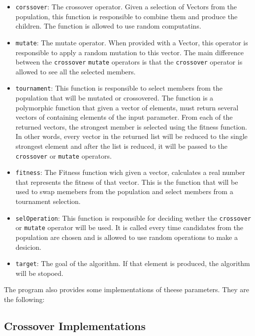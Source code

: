 \documentclass[10pt]{article}
\begin{document}
\begin{itemize}
\item \verb+corssover+: The crossover operator. Given a selection of Vectors from the population, this function is responsible to combine them and produce the children. The function is allowed to use random computatins.
\item \verb+mutate+: The mutate operator. When provided with a Vector, this operator is responsible to apply a random mutation to this vector. The main difference between the \verb+crossover+ \verb+mutate+ operators is that the \verb+crossover+ operator is allowed to see all the selected members.
\item \verb+tournament+: This function is responsible to select members from the population that will be mutated or crossovered. The function is a polymorphic function that given a vector of elements, must return several vectors of containing elements of the input parameter. From each of the returned vectors, the strongest member is selected using the fitness function. In other words, every vector in the returned list will be reduced to the single strongest element and after the list is reduced, it will be passed to the \verb+crossover+ or \verb+mutate+ operators.
\item \verb+fitness+: The Fitness function wich given a vector, calculates a real number that represents the fitness of that vector. This is the function that will be used to swap memebers from the population and select members from a tournament selection.
\item \verb+selOperation+: This function is responsible for deciding wether the \verb+crossover+ or \verb+mutate+ operator will be used. It is called every time candidates from the population are chosen and is allowed to use random operations to make a desicion.
\item \verb+target+: The goal of the algorithm. If that element is produced, the algorithm will be stopoed.
\end{itemize} 

The program also provides some implementations of theese parameters. They are the following:

\subsection{Crossover Implementations} 
\end{document}
